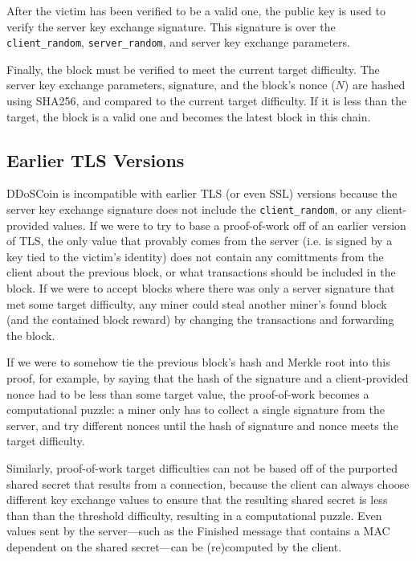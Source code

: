 After the victim has been verified to be a valid one, the public key is used to
verify the server key exchange signature. This signature is over the
\texttt{client\_random}, \texttt{server\_random}, and server key exchange
parameters.

Finally, the block must be verified to meet the current target difficulty. The
server key exchange parameters, signature, and the block's nonce ($N$) are
hashed using SHA256, and compared to the current target difficulty. If it is
less than the target, the block is a valid one and becomes the latest block in
this chain.

\subsection{Earlier TLS Versions}

DDoSCoin is incompatible with earlier TLS (or even SSL) versions because the
server key exchange signature does not include the \texttt{client\_random}, or
any client-provided values. If we were to try to base a proof-of-work off of an
earlier version of TLS, the only value that provably comes from the server (i.e.
is signed by a key tied to the victim's identity) does not contain any
comittments from the client about the previous block, or what transactions
should be included in the block. If we were to accept blocks where there was
only a server signature that met some target difficulty, any miner could steal
another miner's found block (and the contained block reward) by changing the
transactions and forwarding the block.

If we were to somehow tie the previous block's hash and Merkle root into this
proof, for example, by saying that the hash of the signature and a
client-provided nonce had to be less than some target value, the proof-of-work becomes
a computational puzzle: a miner only has to collect a single signature from
the server, and try different nonces until the hash of signature and nonce meets
the target difficulty.

Similarly, proof-of-work target difficulties can not be based off of the
purported shared secret that results from a connection, because the client can
always choose different key exchange values to ensure that the resulting shared
secret is less than than the threshold difficulty, resulting in a computational
puzzle. Even values sent by the server---such as the Finished message that
contains a MAC dependent on the shared secret---can be (re)computed by the client.

